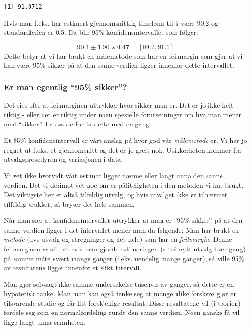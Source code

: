 \documentclass[
  letterpaper,
  DIV=11,
  numbers=noendperiod]{scrreprt}
\theoremstyle{definition}
\theoremstyle{remark}
\begin{document}
\begin{verbatim}
[1] 91.0712
\end{verbatim}

Hvis man f.eks. har estimert gjennomsnittlig timelønn til å være 90.2 og
standardfeilen er 0.5. Da blir 95\% konfidensintervallet som følger:

\[ 90.1 \pm 1.96 \times 0.47 = [89.2, 91.1]\] Dette betyr at vi har
brukt en målemetode som har en feilmargin som gjør at vi kan være 95\%
sikker på at den sanne verdien ligger innenfor dette intervallet.

\hypertarget{er-man-egentlig-95-sikker}{%
\subsubsection{Er man egentlig ``95\%
sikker''?}\label{er-man-egentlig-95-sikker}}

Det sies ofte at feilmarginen uttrykker hvor sikker man er. Det er jo
ikke helt riktig - eller det er riktig under noen spesielle
forutsetninger om hva man mener med ``sikker''. La oss derfor ta dette
med en gang.

Et 95\% konfidensintervall er vårt anslag på hvor god vår
\emph{målemetode} er. Vi har jo regnet ut f.eks. et gjennomsnitt og det
er jo greit nok. Usikkerheten kommer fra utvalgsprosedyren og
variasjonen i data.

Vi vet ikke hvorvidt vårt estimat ligger nærme eller langt unna den
sanne verdien. Det vi derimot vet noe om er påliteligheten i den metoden
vi har brukt. Det viktigste her er altså tilfeldig utvalg, og hvis
utvalget ikke er tilnærmet tilfeldig trukket, så bryter det hele sammen.

Når man sier at konfidensintervallet uttrykker at man er ``95\% sikker''
på at den sanne verdien ligger i det intervallet mener man da følgende:
Man har brukt en \emph{metode} (dvs utvalg og utregninger og det hele)
som har en \emph{feilmargin}. Denne feilmarginen er slik at hvis man
gjorde estimeringen (altså nytt utvalg hver gang) på samme måte svært
mange ganger (f.eks. uendelig mange ganger), så ville 95\% av
resultatene ligget innenfor et slikt intervall.

Man gjør selvsagt ikke samme undersøkelse tusenvis av ganger, så dette
er en hypotetisk tanke. Man man kan også tenke seg at mange ulike
forskere gjør en tilsvarende studie og får litt forskjellige resultat.
Disse resultatene vil (i teorien) fordele seg som en normalfordeling
rundt den sanne verdien. Noen ganske få vil ligge langt unna sannheten.
\end{document}
